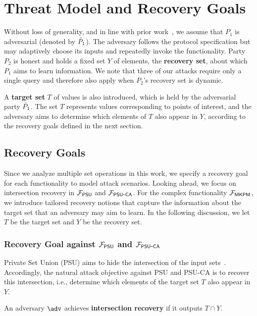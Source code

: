 \section{Threat Model and Recovery Goals}
\label{sec:threat-model-recovery-goals}

Without loss of generality, and in line with prior work~\cite{USENIX:GHLWJL22,NDSS:JiaDuYan24,USENIX:FalTan25}, we assume that $P_1$ is adversarial (denoted by $\tilde{P}_1$). The adversary follows the protocol specification but may adaptively choose its inputs and repeatedly invoke the functionality. Party $P_2$ is honest and holds a fixed set $Y$ of elements, the \textbf{recovery set}, about which $P_1$ aims to learn information. We note that three of our attacks require only a single query and therefore also apply when $P_2$’s recovery set is dynamic.

A \textbf{target set} $T$ of values is also introduced, which is held by the
adversarial party $\tilde{P}_1$. The set $T$ represents values corresponding to points
of interest, and the adversary aims to determine which elements of $T$ also
appear in $Y$, according to the recovery goals defined in the next section.

\subsection{Recovery Goals}
\label{sec:recovery-goals}
Since we analyze multiple set operations in this work, we specify a recovery
goal for each functionality to model attack scenarios. Looking ahead, we focus
on intersection recovery in $\mathcal{F}_{\mathsf{PSU}}$ and $\mathcal{F}_{\mathsf{PSU\mbox{-}CA}}$. For the complex
functionality $\mathcal{F}_{\mathsf{MKPM}}$, we introduce tailored recovery notions that
capture the information about the target set that an adversary may aim to learn.
In the following discussion, we let $T$ be the target set and $Y$ be the
recovery set.

\subsubsection{Recovery Goal against $\mathcal{F}_{\mathsf{PSU}}$ and $\mathcal{F}_{\mathsf{PSU\mbox{-}CA}}$}
\label{sec:IR_goal}
Private Set Union (PSU) aims to hide the intersection of the input
sets~\cite{USENIX:JSZG24}. Accordingly, the natural attack objective against PSU
and PSU-CA is to recover this intersection, i.e., determine which elements of
the target set $T$ also appear in $Y$.

\begin{definition}
  \label{def:intersection-recovery}
  An adversary $\adv$ achieves \textbf{intersection recovery} if it outputs
  $T \cap Y$.
\end{definition}

